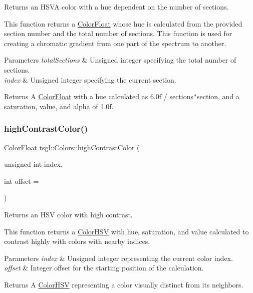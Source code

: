 Returns an H\+S\+VA color with a hue dependent on the number of sections. 

This function returns a \hyperlink{structtsgl_1_1_color_float}{Color\+Float} whose hue is calculated from the provided section number and the total number of sections. This function is used for creating a chromatic gradient from one part of the spectrum to another. 
\begin{DoxyParams}{Parameters}
{\em total\+Sections} & Unsigned integer specifying the total number of sections. \\
\hline
{\em index} & Unsigned integer specifying the current section. \\
\hline
\end{DoxyParams}
\begin{DoxyReturn}{Returns}
A \hyperlink{structtsgl_1_1_color_float}{Color\+Float} with a hue calculated as 6.\+0f / sections$\ast$section, and a saturation, value, and alpha of 1.\+0f. 
\end{DoxyReturn}
\mbox{\label{classtsgl_1_1_colors_a93d3fc815542e586dbc1ecf3e984e0b6}} 
\subsubsection{\texorpdfstring{high\+Contrast\+Color()}{highContrastColor()}}
{\footnotesize\ttfamily \hyperlink{structtsgl_1_1_color_float}{Color\+Float} tsgl\+::\+Colors\+::high\+Contrast\+Color (\begin{DoxyParamCaption}\item[{unsigned int}]{index,  }\item[{int}]{offset = {} }\end{DoxyParamCaption})\hspace{0.3cm}{\ttfamily [static]}}



Returns an H\+SV color with high contrast. 

This function returns a \hyperlink{structtsgl_1_1_color_h_s_v}{Color\+H\+SV} with hue, saturation, and value calculated to contrast highly with colors with nearby indices. 
\begin{DoxyParams}{Parameters}
{\em index} & Unsigned integer representing the current color index. \\
\hline
{\em offset} & Integer offset for the starting position of the calculation. \\
\hline
\end{DoxyParams}
\begin{DoxyReturn}{Returns}
A \hyperlink{structtsgl_1_1_color_h_s_v}{Color\+H\+SV} representing a color visually distinct from its neighbors. 
\end{DoxyReturn}


